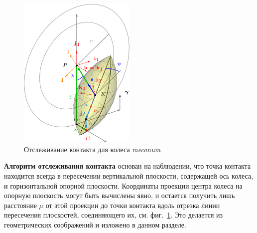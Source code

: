 \begin{figure}[H]
    \centering
    \includegraphics[width=0.5\textwidth]{./content/pic/asy/pic_mecanum.png}
    \caption{Отслеживание контакта для колеса \textit{mecanum}}
    \label{fig:mecanum}
\end{figure}

\textbf{Алгоритм отслеживания контакта} основан на наблюдении, что точка контакта находится всегда в пересечении вертикальной плоскости, содержащей ось колеса, и горизонтальной опорной плоскости. Координаты проекции центра колеса на опорную плоскость могут быть вычислены явно, и остается получить лишь расстояние $\mu$ от этой проекции до точки контакта вдоль отрезка линии пересечения плоскостей, соединяющего их, см. фиг.~\ref{fig:mecanum}.
Это делается из геометрических соображений и изложено в данном разделе.



